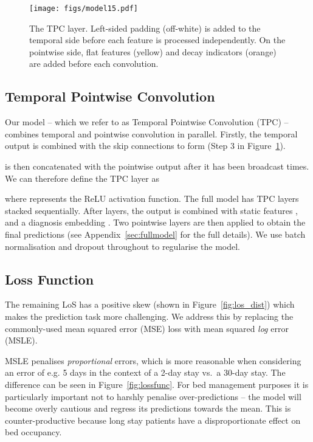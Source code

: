 \documentclass[sigconf]{acmart}
\begin{document}
\begin{figure}
\texttt{[image: figs/model15.pdf]}
\caption{The  TPC layer. Left-sided padding (off-white) is added to the temporal side before each feature is processed independently. On the pointwise side, flat features (yellow) and decay indicators (orange) are added before each convolution.} 
\label{fig:TPC}
\end{figure}

\subsection{Temporal Pointwise Convolution}
Our model -- which we refer to as Temporal Pointwise Convolution (TPC) -- combines temporal and pointwise convolution in parallel. Firstly, the temporal output is combined with the skip connections to form  (Step 3 in Figure~\ref{fig:TPC}).

 is then concatenated with the pointwise output after it has been broadcast  times. We can therefore define the  TPC layer as

where  represents the ReLU activation function. The full model has  TPC layers stacked sequentially. After  layers, the output  is combined with static features , and a diagnosis embedding . Two pointwise layers are then applied to obtain the final predictions (see Appendix~\ref{sec:fullmodel} for the full details). We use batch normalisation \citep{Ioffe2015} and dropout \citep{Srivastava2014} throughout to regularise the model. 

\subsection{Loss Function}
The remaining LoS has a positive skew (shown in Figure~\ref{fig:los_dist}) which makes the prediction task more challenging. We address this by replacing the commonly-used mean squared error (MSE) loss with mean squared \textit{log} error (MSLE). 

MSLE penalises \textit{proportional} errors, which is more reasonable when considering an error of e.g. 5 days in the context of a 2-day stay vs.\ a 30-day stay. The difference can be seen in Figure~\ref{fig:lossfunc}. For bed management purposes it is particularly important not to harshly penalise over-predictions -- the model will become overly cautious and regress its predictions towards the mean. This is counter-productive because long stay patients have a disproportionate effect on bed occupancy.
\end{document}
